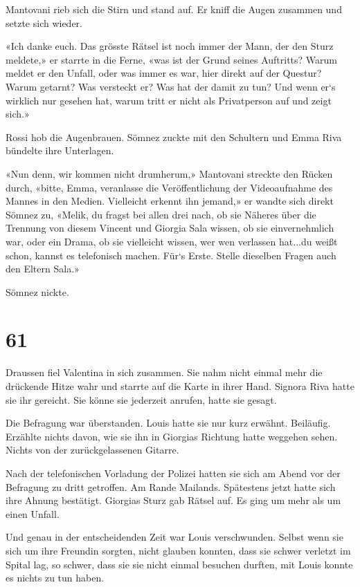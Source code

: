 Mantovani rieb sich die Stirn und stand auf. Er kniff die Augen zusammen
und setzte sich wieder.

«Ich danke euch. Das grösste Rätsel ist noch immer der Mann, der den
Sturz meldete,» er starrte in die Ferne, «was ist der Grund seines
Auftritts? Warum meldet er den Unfall, oder was immer es war, hier
direkt auf der Questur? Warum getarnt? Was versteckt er? Was hat der
damit zu tun? Und wenn er`s wirklich nur gesehen hat, warum tritt er
nicht als Privatperson auf und zeigt sich.»

Rossi hob die Augenbrauen. Sömnez zuckte mit den Schultern und Emma Riva
bündelte ihre Unterlagen.

«Nun denn, wir kommen nicht drumherum,» Mantovani streckte den Rücken
durch, «bitte, Emma, veranlasse die Veröffentlichung der Videoaufnahme
des Mannes in den Medien. Vielleicht erkennt ihn jemand,» er wandte sich
direkt Sömnez zu, «Melik, du fragst bei allen drei nach, ob sie Näheres
über die Trennung von diesem Vincent und Giorgia Sala wissen, ob sie
einvernehmlich war, oder ein Drama, ob sie vielleicht wissen, wer wen
verlassen hat...du weißt schon, kannst es telefonisch machen. Für`s
Erste. Stelle dieselben Fragen auch den Eltern Sala.»

Sömnez nickte.

\chapter{61}\label{section-61}

Draussen fiel Valentina in sich zusammen. Sie nahm nicht einmal mehr die
drückende Hitze wahr und starrte auf die Karte in ihrer Hand. Signora
Riva hatte sie ihr gereicht. Sie könne sie jederzeit anrufen, hatte sie
gesagt.

Die Befragung war überstanden. Louis hatte sie nur kurz erwähnt.
Beiläufig. Erzählte nichts davon, wie sie ihn in Giorgias Richtung hatte
weggehen sehen. Nichts von der zurückgelassenen Gitarre.

Nach der telefonischen Vorladung der Polizei hatten sie sich am Abend
vor der Befragung zu dritt getroffen. Am Rande Mailands. Spätestens
jetzt hatte sich ihre Ahnung bestätigt. Giorgias Sturz gab Rätsel auf.
Es ging um mehr als um einen Unfall.

Und genau in der entscheidenden Zeit war Louis verschwunden. Selbst wenn
sie sich um ihre Freundin sorgten, nicht glauben konnten, dass sie
schwer verletzt im Spital lag, so schwer, dass sie sie nicht einmal
besuchen durften, mit Louis konnte es nichts zu tun haben.

